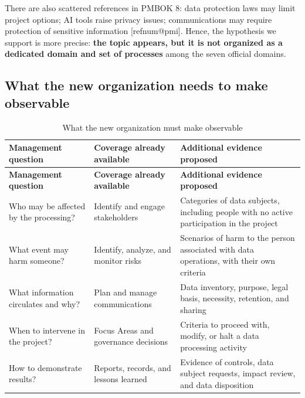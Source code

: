 \documentclass[11pt,a4paper]{article}
\makeatletter
\newcommand{\refnum}[1]{\csname refnum@#1\endcsname}
\newcommand{\SingleSpacing}{}
\newcommand{\fontetab}[1]{\par\vspace{3pt}{\small\noindent Source: #1\par}}
\makeatother
\begin{document}
There are also scattered references in PMBOK 8: data protection laws may limit project options; AI tools raise privacy issues; communications may require protection of sensitive information [\refnum{pmi}]. Hence, the hypothesis we support is more precise: \textbf{the topic appears, but it is not organized as a dedicated domain and set of processes} among the seven official domains.
\subsection{What the new organization needs to make observable}

\begingroup\SingleSpacing\small
\begin{longtable}{@{}>{\raggedright\arraybackslash}p{}>{\raggedright\arraybackslash}p{}>{\raggedright\arraybackslash}p{}@{}}
\caption{What the new organization must make observable}\label{tab:t1}\\
\toprule
\textbf{Management question} & \textbf{Coverage already available} & \textbf{Additional evidence proposed}\\
\midrule
\endfirsthead
\toprule
\textbf{Management question} & \textbf{Coverage already available} & \textbf{Additional evidence proposed}\\
\midrule
\endhead
\bottomrule
\endfoot
\bottomrule
\endlastfoot
Who may be affected by the processing? & Identify and engage stakeholders & Categories of data subjects, including people with no active participation in the project\\[3pt]
What event may harm someone? & Identify, analyze, and monitor risks & Scenarios of harm to the person associated with data operations, with their own criteria\\[3pt]
What information circulates and why? & Plan and manage communications & Data inventory, purpose, legal basis, necessity, retention, and sharing\\[3pt]
When to intervene in the project? & Focus Areas and governance decisions & Criteria to proceed with, modify, or halt a data processing activity\\[3pt]
How to demonstrate results? & Reports, records, and lessons learned & Evidence of controls, data subject requests, impact review, and data disposition\\[3pt]
\end{longtable}
\endgroup
\fontetab{Prepared by the authors (2026).}
\end{document}
